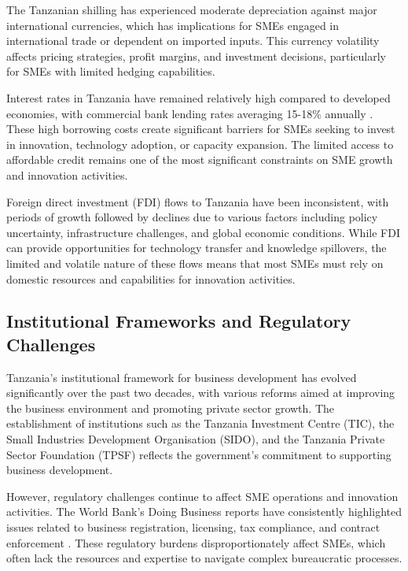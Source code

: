 \documentclass[12pt,a4paper]{article}
\begin{document}
The Tanzanian shilling has experienced moderate depreciation against major international currencies, which has implications for SMEs engaged in international trade or dependent on imported inputs. This currency volatility affects pricing strategies, profit margins, and investment decisions, particularly for SMEs with limited hedging capabilities.

Interest rates in Tanzania have remained relatively high compared to developed economies, with commercial bank lending rates averaging 15-18\% annually \cite{boz2023monetary}. These high borrowing costs create significant barriers for SMEs seeking to invest in innovation, technology adoption, or capacity expansion. The limited access to affordable credit remains one of the most significant constraints on SME growth and innovation activities.

Foreign direct investment (FDI) flows to Tanzania have been inconsistent, with periods of growth followed by declines due to various factors including policy uncertainty, infrastructure challenges, and global economic conditions. While FDI can provide opportunities for technology transfer and knowledge spillovers, the limited and volatile nature of these flows means that most SMEs must rely on domestic resources and capabilities for innovation activities.

\subsection{Institutional Frameworks and Regulatory Challenges}

Tanzania's institutional framework for business development has evolved significantly over the past two decades, with various reforms aimed at improving the business environment and promoting private sector growth. The establishment of institutions such as the Tanzania Investment Centre (TIC), the Small Industries Development Organisation (SIDO), and the Tanzania Private Sector Foundation (TPSF) reflects the government's commitment to supporting business development.

However, regulatory challenges continue to affect SME operations and innovation activities. The World Bank's Doing Business reports have consistently highlighted issues related to business registration, licensing, tax compliance, and contract enforcement \cite{worldbank2023doingbusiness}. These regulatory burdens disproportionately affect SMEs, which often lack the resources and expertise to navigate complex bureaucratic processes.
\end{document}
